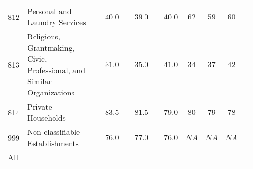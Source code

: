 \documentclass[9pt, oneside]{article}   	%
\begin{document}
\begin{longtable}{lp{3 in}ccccccc}
812  & Personal and Laundry Services & $\phantom{00}40.0$ & $\phantom{00}39.0$ & $\phantom{00}40.0$ & $62$ & $59$ & $60$ \\
813  & Religious, Grantmaking, Civic, Professional, and Similar Organizations & $\phantom{00}31.0$ & $\phantom{00}35.0$ & $\phantom{00}41.0$ & $34$ & $37$ & $42$ \\
814  & Private Households & $\phantom{00}83.5$ & $\phantom{00}81.5$ & $\phantom{00}79.0$ & $80$ & $79$ & $78$ \\
999  & Non-classifiable Establishments & $\phantom{00}76.0$ & $\phantom{00}77.0$ & $\phantom{00}76.0$ & $NA$ & $NA$ & $NA$ \\
\cline{1-1} \cline{2-2} \cline{3-3} \cline{4-4} \cline{5-5} \cline{6-6} \cline{7-7} \cline{8-8} \cline{9-9} %
All  & &  &  &  &  &  &  \\
\hline 
\end{longtable}




\pagebreak
\end{document}
